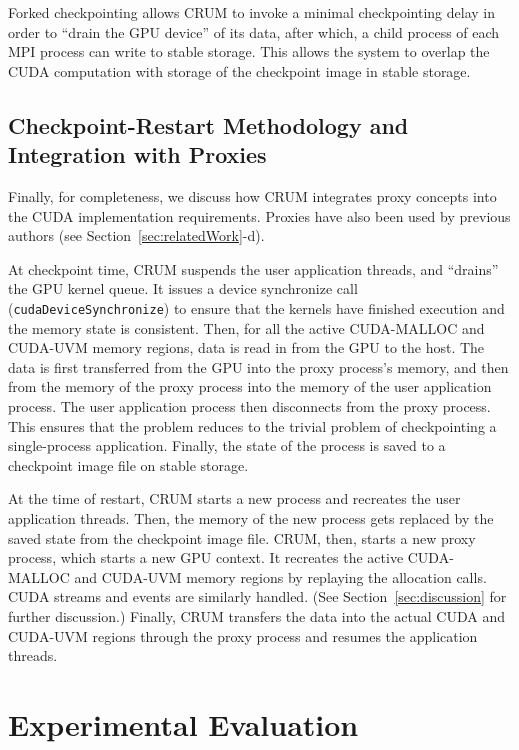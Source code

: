 \documentclass[11pt]{article}
\begin{document}
Forked checkpointing allows CRUM to invoke a minimal checkpointing delay in order
to ``drain the GPU device'' of its data, after which, a child process of each
MPI process can write to stable storage. This allows the system to overlap
the CUDA computation with storage of the checkpoint image in stable storage.

\subsection{Checkpoint-Restart Methodology and Integration with Proxies}
\label{sec:proxyCkptRestart}

Finally, for completeness, we discuss how CRUM integrates proxy
concepts into the CUDA implementation requirements.  Proxies have
also been used by previous authors (see Section~\ref{sec:relatedWork}-d).

At checkpoint time, CRUM suspends the user application threads, and
``drains'' the GPU kernel queue. It issues a device synchronize call
(\texttt{cudaDeviceSynchronize}) to ensure that the kernels have finished
execution and the memory state is consistent. Then, for all the active
CUDA-MALLOC
and CUDA-UVM memory regions, data is read in from the GPU to the host. The
data is first transferred from the GPU into the proxy process's memory,
and then from the memory of the proxy process into the memory of the user
application process.  The user application process then disconnects from the
proxy process. This ensures that the problem reduces to the trivial problem
of checkpointing a single-process application. Finally, the state of the
process is saved to a checkpoint image file on stable storage.

At the time of restart, CRUM starts a new process and recreates the user
application threads. Then, the memory of the new process gets replaced by
the saved state from the checkpoint image file. CRUM, then, starts a new
proxy process, which starts a new GPU context. It recreates the active
CUDA-MALLOC and CUDA-UVM memory regions by replaying the allocation calls.
CUDA streams and events are similarly handled.
(See Section~\ref{sec:discussion} for further discussion.)
Finally, CRUM transfers
the data into the actual CUDA and CUDA-UVM regions through the proxy process
and resumes the application threads.


\section{Experimental Evaluation}
\label{sec:evaluation}
\end{document}
